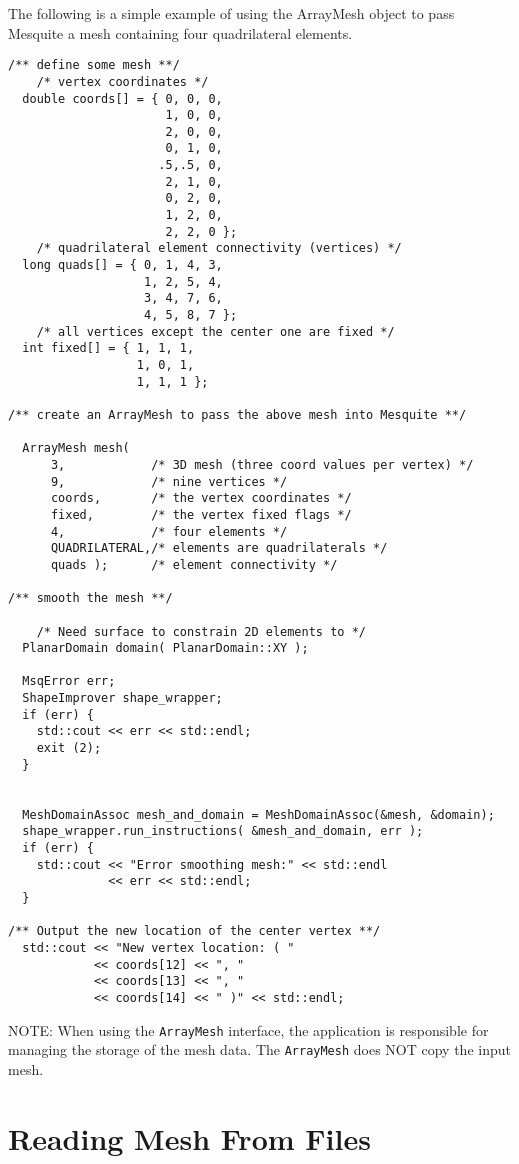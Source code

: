 The following is a simple example of using the ArrayMesh object to pass
Mesquite a mesh containing four quadrilateral elements.
\begin{lstlisting}
/** define some mesh **/
    /* vertex coordinates */
  double coords[] = { 0, 0, 0,
                      1, 0, 0,
                      2, 0, 0,
                      0, 1, 0,
                     .5,.5, 0,
                      2, 1, 0,
                      0, 2, 0,
                      1, 2, 0,
                      2, 2, 0 };
    /* quadrilateral element connectivity (vertices) */
  long quads[] = { 0, 1, 4, 3,
                   1, 2, 5, 4,
                   3, 4, 7, 6,
                   4, 5, 8, 7 };
    /* all vertices except the center one are fixed */
  int fixed[] = { 1, 1, 1,
                  1, 0, 1,
                  1, 1, 1 };
  
/** create an ArrayMesh to pass the above mesh into Mesquite **/
  
  ArrayMesh mesh( 
      3,            /* 3D mesh (three coord values per vertex) */
      9,            /* nine vertices */
      coords,       /* the vertex coordinates */ 
      fixed,        /* the vertex fixed flags */
      4,            /* four elements */
      QUADRILATERAL,/* elements are quadrilaterals */
      quads );      /* element connectivity */
  
/** smooth the mesh **/
  
    /* Need surface to constrain 2D elements to */
  PlanarDomain domain( PlanarDomain::XY );

  MsqError err;
  ShapeImprover shape_wrapper;
  if (err) {
    std::cout << err << std::endl;
    exit (2);
  }
  

  MeshDomainAssoc mesh_and_domain = MeshDomainAssoc(&mesh, &domain);
  shape_wrapper.run_instructions( &mesh_and_domain, err );
  if (err) {
    std::cout << "Error smoothing mesh:" << std::endl
              << err << std::endl;
  }
  
/** Output the new location of the center vertex **/
  std::cout << "New vertex location: ( "
            << coords[12] << ", " 
            << coords[13] << ", " 
            << coords[14] << " )" << std::endl;
\end{lstlisting}

NOTE:  When using the \texttt{ArrayMesh} interface, the application is responsible for managing the storage of the mesh data.  The \texttt{ArrayMesh}
 does NOT copy the input mesh.  

 
\section{Reading Mesh From Files} \label{sec:meshFiles}

